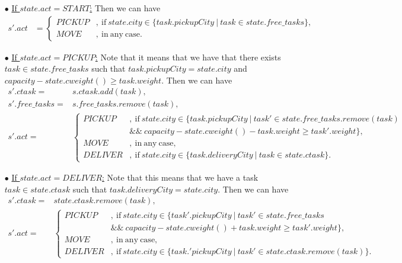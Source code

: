 \documentclass[11pt]{article}
\begin{document}
\begin{itemize}
	\item[$\bullet$] \underline{If $state.act=START$:} Then we can have 
		\begin{align*}
			s'.act &= \begin{cases}
					 PICKUP &,\ \mathrm{if}\ state.city\in\{task.pickupCity\ |\ task\in state.free\_tasks\},\\
					 MOVE &,\ \mathrm{in\ any\ case}.
				       \end{cases}
		\end{align*}
		
	\item[$\bullet$] \underline{If $state.act=PICKUP$:} Note that it means that we have that there exists $task\in state.free\_tasks$ such that $task.pickupCity=state.city$ and $capacity-state.cweight()\geq task.weight$. Then we can have 
		\begin{align*}
			s'.ctask =& s.ctask.add(task),\\
			s'.free\_tasks =& s.free\_tasks.remove(task),\\
			s'.act =& \begin{cases}
						PICKUP &,\ \mathrm{if}\ state.city\in\{task.pickupCity\ |\ task'\in state.free\_tasks.remove(task)\\ & \&\&\ capacity-state.cweight() - task.weight \geq task'.weight\},\\
						MOVE &,\ \mathrm{in\ any\ case},\\
						DELIVER &,\ \mathrm{if}\ state.city\in\{task.deliveryCity\ |\ task\in state.ctask\}.
					\end{cases}
		\end{align*}
	
	\item[$\bullet$] \underline{If $state.act=DELIVER$:} Note that this means that we have a task $task\in state.ctask$ such that $task.deliveryCity = state.city$. Then we can have
		\begin{align*}
			s'.ctask =& state.ctask.remove(task),\\
			s'.act =& \begin{cases}
						PICKUP &,\ \mathrm{if}\ state.city\in\{task'.pickupCity\ |\  task'\in state.free\_tasks\\
						& \&\&\ capacity-state.cweight() + task.weight \geq task'.weight\},\\
						MOVE &,\ \mathrm{in\ any\ case},\\
						DELIVER &,\ \mathrm{if}\ state.city\in\{task.'pickupCity\ |\ task'\in state.ctask.remove(task)\}.
					\end{cases}
		\end{align*}
		

\end{itemize}
\end{document}

